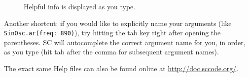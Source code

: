 \begin{figure}[h]
\centerline{}
\caption{Helpful info is displayed as you type.}
\label{fig:tooltip}
\end{figure}

Another shortcut: if you would like to explicitly name your arguments (like \texttt{SinOsc.ar(freq: 890)}), try hitting the tab key right after opening the parentheses. SC will autocomplete the correct argument name for you, in order, as you type (hit tab after the comma for subsequent argument names).

\bigskip
{}
\bigskip

The exact same Help files can also be found online at \url{http://doc.sccode.org/}.